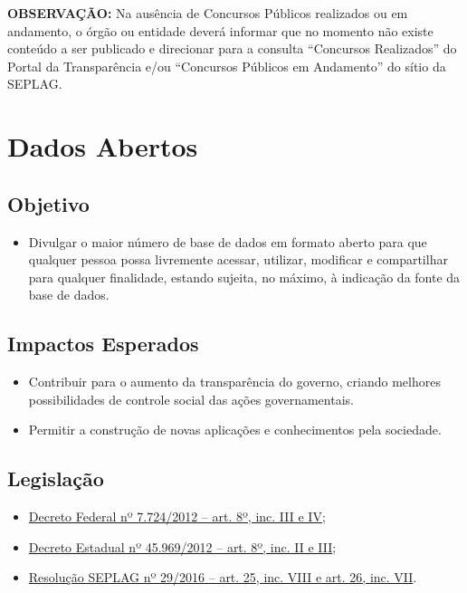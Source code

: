 \documentclass[]{book}
\providecommand{\tightlist}{%
  \setlength{\itemsep}{0pt}\setlength{\parskip}{0pt}}
\begin{document}
\textbf{OBSERVAÇÃO:} Na ausência de Concursos Públicos realizados ou em andamento, o órgão ou entidade deverá informar que no momento não existe conteúdo a ser publicado e direcionar para a consulta ``Concursos Realizados'' do Portal da Transparência e/ou ``Concursos Públicos em Andamento'' do sítio da SEPLAG.

\hypertarget{dados-abertos}{%
\section{Dados Abertos}\label{dados-abertos}}

\hypertarget{objetivo-9}{%
\subsection{Objetivo}\label{objetivo-9}}

\begin{itemize}
\tightlist
\item
  Divulgar o maior número de base de dados em formato aberto para que qualquer pessoa possa livremente acessar, utilizar, modificar e compartilhar para qualquer finalidade, estando sujeita, no máximo, à indicação da fonte da base de dados.
\end{itemize}

\hypertarget{impactos-esperados-10}{%
\subsection{Impactos Esperados}\label{impactos-esperados-10}}

\begin{itemize}
\tightlist
\item
  Contribuir para o aumento da transparência do governo, criando melhores possibilidades de controle social das ações
  governamentais.
\item
  Permitir a construção de novas aplicações e conhecimentos pela sociedade.
\end{itemize}

\hypertarget{legislauxe7uxe3o-10}{%
\subsection{Legislação}\label{legislauxe7uxe3o-10}}

\begin{itemize}
\tightlist
\item
  \href{http://www.planalto.gov.br/ccivil_03/_ato2011-2014/2012/decreto/d7724.htm\#art8}{Decreto Federal nº 7.724/2012 -- art. 8º, inc. III e IV};
\item
  \href{https://www.almg.gov.br/consulte/legislacao/completa/completa.html?tipo=DEC\&num=45969\&ano=2012}{Decreto Estadual nº 45.969/2012 -- art. 8º, inc. II e III};
\item
  \href{http://www.planejamento.mg.gov.br/sites/default/files/documentos/resolucao_sitios_seplag_29_de_05_07_2016_1.pdf}{Resolução SEPLAG nº 29/2016 -- art. 25, inc. VIII e art. 26, inc. VII}.
\end{itemize}
\end{document}
